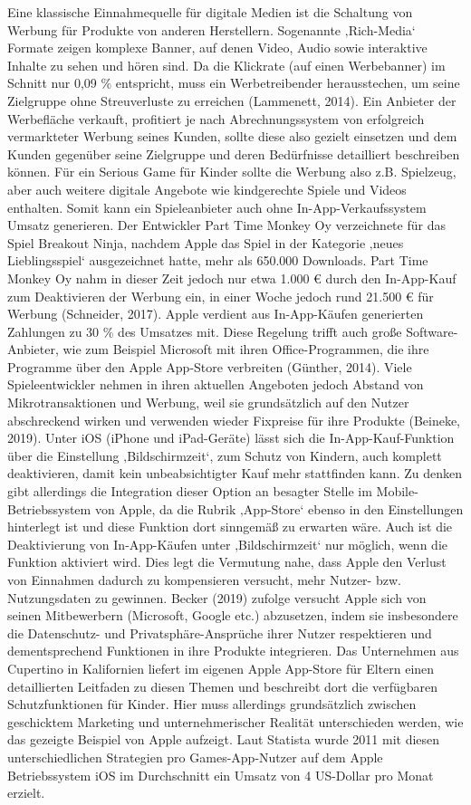 \documentclass[
  a4paper,
  DIV=11,
  numbers=noendperiod,
  onecolumn,
  oneside,
  a4paper]{scrartcl}
\begin{document}
Eine klassische Einnahmequelle für digitale Medien ist die Schaltung von
Werbung für Produkte von anderen Herstellern. Sogenannte ‚Rich-Media`
Formate zeigen komplexe Banner, auf denen Video, Audio sowie interaktive
Inhalte zu sehen und hören sind. Da die Klickrate (auf einen
Werbebanner) im Schnitt nur 0,09 \% entspricht, muss ein Werbetreibender
herausstechen, um seine Zielgruppe ohne Streuverluste zu erreichen
(Lammenett, 2014). Ein Anbieter der Werbefläche verkauft, profitiert je
nach Abrechnungssystem von erfolgreich vermarkteter Werbung seines
Kunden, sollte diese also gezielt einsetzen und dem Kunden gegenüber
seine Zielgruppe und deren Bedürfnisse detailliert beschreiben können.
Für ein Serious Game für Kinder sollte die Werbung also z.B. Spielzeug,
aber auch weitere digitale Angebote wie kindgerechte Spiele und Videos
enthalten. Somit kann ein Spieleanbieter auch ohne In-App-Verkaufssystem
Umsatz generieren. Der Entwickler Part Time Monkey Oy verzeichnete für
das Spiel Breakout Ninja, nachdem Apple das Spiel in der Kategorie
‚neues Lieblingsspiel` ausgezeichnet hatte, mehr als 650.000 Downloads.
Part Time Monkey Oy nahm in dieser Zeit jedoch nur etwa 1.000 € durch
den In-App-Kauf zum Deaktivieren der Werbung ein, in einer Woche jedoch
rund 21.500 € für Werbung (Schneider, 2017). Apple verdient aus
In-App-Käufen generierten Zahlungen zu 30 \% des Umsatzes mit. Diese
Regelung trifft auch große Software-Anbieter, wie zum Beispiel Microsoft
mit ihren Office-Programmen, die ihre Programme über den Apple App-Store
verbreiten (Günther, 2014). Viele Spieleentwickler nehmen in ihren
aktuellen Angeboten jedoch Abstand von Mikrotransaktionen und Werbung,
weil sie grundsätzlich auf den Nutzer abschreckend wirken und verwenden
wieder Fixpreise für ihre Produkte (Beineke, 2019). Unter iOS (iPhone
und iPad-Geräte) lässt sich die In-App-Kauf-Funktion über die
Einstellung ‚Bildschirmzeit`, zum Schutz von Kindern, auch komplett
deaktivieren, damit kein unbeabsichtigter Kauf mehr stattfinden kann. Zu
denken gibt allerdings die Integration dieser Option an besagter Stelle
im Mobile-Betriebssystem von Apple, da die Rubrik ‚App-Store` ebenso in
den Einstellungen hinterlegt ist und diese Funktion dort sinngemäß zu
erwarten wäre. Auch ist die Deaktivierung von In-App-Käufen unter
‚Bildschirmzeit` nur möglich, wenn die Funktion aktiviert wird. Dies
legt die Vermutung nahe, dass Apple den Verlust von Einnahmen dadurch zu
kompensieren versucht, mehr Nutzer- bzw. Nutzungsdaten zu gewinnen.
Becker (2019) zufolge versucht Apple sich von seinen Mitbewerbern
(Microsoft, Google etc.) abzusetzen, indem sie insbesondere die
Datenschutz- und Privatsphäre-Ansprüche ihrer Nutzer respektieren und
dementsprechend Funktionen in ihre Produkte integrieren. Das Unternehmen
aus Cupertino in Kalifornien liefert im eigenen Apple App-Store für
Eltern einen detaillierten Leitfaden zu diesen Themen und beschreibt
dort die verfügbaren Schutzfunktionen für Kinder. Hier muss allerdings
grundsätzlich zwischen geschicktem Marketing und unternehmerischer
Realität unterschieden werden, wie das gezeigte Beispiel von Apple
aufzeigt. Laut Statista wurde 2011 mit diesen unterschiedlichen
Strategien pro Games-App-Nutzer auf dem Apple Betriebssystem iOS im
Durchschnitt ein Umsatz von 4 US-Dollar pro Monat erzielt.
\end{document}
